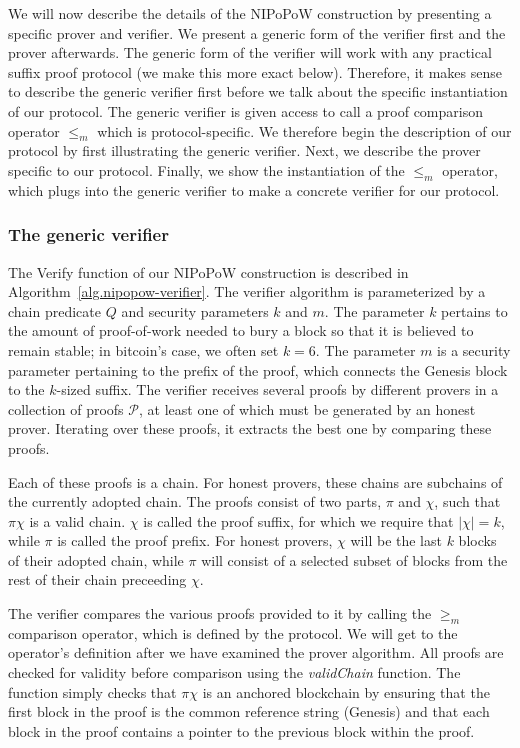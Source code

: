 We will now describe the details of the NIPoPoW construction by presenting a
specific prover and verifier. We present a generic form of the verifier first
and the prover afterwards. The generic form of the verifier will work with any
practical suffix proof protocol (we make this more exact below). Therefore, it
makes sense to describe the generic verifier first before we talk about the
specific instantiation of our protocol. The generic verifier is given access to
call a proof comparison operator $\leq_m$ which is protocol-specific. We
therefore begin the description of our protocol by first illustrating the
generic verifier. Next, we describe the prover specific to our protocol.
Finally, we show the instantiation of the $\leq_m$ operator, which plugs into
the generic verifier to make a concrete verifier for our protocol.

\subsubsection{The generic verifier}

The \textsf{Verify} function of our NIPoPoW construction is described in
Algorithm~\ref{alg.nipopow-verifier}. The verifier algorithm is parameterized by
a chain predicate $Q$ and security parameters $k$ and $m$. The parameter $k$
pertains to the amount of proof-of-work needed to bury a block so that it is
believed to remain stable; in bitcoin's case, we often set $k = 6$. The
parameter $m$ is a security parameter pertaining to the prefix of the proof,
which connects the Genesis block to the $k$-sized suffix.  The verifier receives
several proofs by different provers in a collection of proofs $\mathcal{P}$, at
least one of which must be generated by an honest prover. Iterating over these
proofs, it extracts the best one by comparing these proofs.

Each of these proofs is a chain. For honest provers, these
chains are subchains of the currently adopted chain. The proofs consist of two
parts, $\pi$ and $\chi$, such that $\pi \chi$ is a valid chain. $\chi$ is called
the proof suffix, for which we require that $|\chi| = k$, while $\pi$ is called
the proof prefix. For honest provers, $\chi$ will be the last $k$ blocks of
their adopted chain, while $\pi$ will consist of a selected subset of blocks
from the rest of their chain preceeding $\chi$.

The verifier compares the various proofs provided to it by calling the $\geq_m$
comparison operator, which is defined by the protocol. We will get to the
operator's definition after we have examined the prover algorithm. All proofs
are checked for validity before comparison using the \textit{validChain}
function. The function simply checks that $\pi\chi$ is an anchored blockchain by
ensuring that the first block in the proof is the common reference string
(Genesis) and that each block in the proof contains a pointer to the previous
block within the proof.

